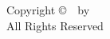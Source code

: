 \begin{titlepage}

\end{titlepage}

\thispagestyle{empty}%
\vspace*{\fill}
\begin{center}
Copyright \copyright ~\mypubyear~by \myname\\
All Rights Reserved
\end{center}
\vspace*{\fill}
\clearpage


\mySpacing
{} \setcounter{page}{3}



